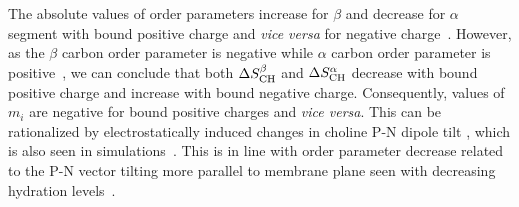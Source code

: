 \documentclass[pre,aps,floatfix,authordate1-4,twocolumn]{revtex4-1}
\begin{document}
The absolute values of order parameters 
increase for $\beta$ and decrease for $\alpha$ segment with bound positive charge
and {\it vice versa} for negative charge~\cite{akutsu81,altenbach84,altenbach85,seelig87,scherer89,rydall92}. 
However, as the $\beta$ carbon order parameter is negative while $\alpha$ carbon order parameter is 
positive~\cite{hong95a,hong95b,gross97}, we can conclude 
that both $\Delta S_{\rm{CH}}^{\beta}$ and $\Delta S_{\rm{CH}}^{\alpha}$ decrease with bound positive charge 
and increase with bound negative charge. Consequently, values of $m_i$ are negative for
bound positive charges and {\it vice versa}. This can be rationalized by electrostatically 
induced changes in choline P-N dipole tilt \cite{seelig87,scherer89,seelig90}, which is also
seen in simulations~\cite{gurtovenko05,cordomi08,cordomi09,zhao12}. %
This is in line with order parameter decrease related to the P-N vector tilting more parallel to membrane plane seen with decreasing hydration levels~\cite{botan15}. 
\end{document}
